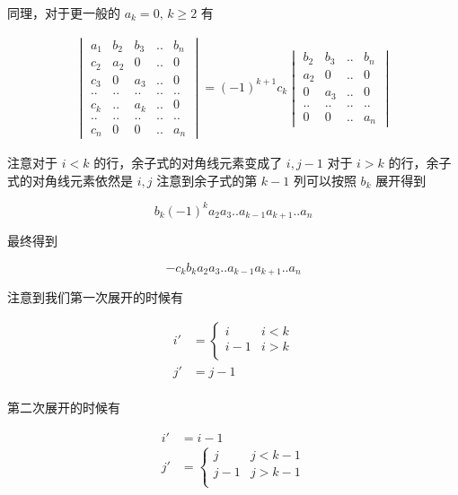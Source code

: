 \documentclass[12pt,a4paper]{ctexart}
\begin{document}
\begin{enumerate}
    同理，对于更一般的 $a_k = 0,\, k \ge 2$ 有

    \begin{align*}
     \begin{vmatrix}
        a_1 & b_2 & b_3 & .. & b_n \\
        c_2 & a_2 & 0 & .. & 0 \\
        c_3 & 0 & a_3 & .. & 0 \\
        .. & .. & .. & .. & ..  \\
        c_k & .. & a_k & .. & 0 \\
        .. & .. & .. & .. & ..  \\
        c_n & 0 & 0 & .. & a_n 
    \end{vmatrix}  =     (-1)^{k+1}c_k     \begin{vmatrix}
          b_2 & b_3 & .. & b_n \\
          a_2 & 0 & .. & 0 \\
          0 & a_3 & .. & 0 \\
         .. & .. & .. & ..  \\
          0 & 0 & .. & a_n 
    \end{vmatrix} 
    \end{align*}

    注意对于 $i < k$ 的行，余子式的对角线元素变成了 $i,j-1$ 对于 $i > k$  的行，余子式的对角线元素依然是 $i,j$
    注意到余子式的第 $k-1$ 列可以按照 $b_k$ 展开得到

    \[
        b_k(-1)^{k}a_2a_3..a_{k-1}a_{k+1}..a_n
    \]

    最终得到

    \[
        -c_kb_k a_2a_3..a_{k-1}a_{k+1}..a_n
    \]

    注意到我们第一次展开的时候有

    \begin{align*}
        i' &= \begin{cases}
            i & i < k \\
            i - 1 & i > k \\
        \end{cases} \\
        j' &= j-1 \\
    \end{align*}

    第二次展开的时候有


    \begin{align*}
        i' &= i-1 \\
        j' &= \begin{cases}
            j & j < k-1 \\
            j - 1 & j > k-1 \\
        \end{cases}
    \end{align*}


\end{enumerate}
\end{document}
